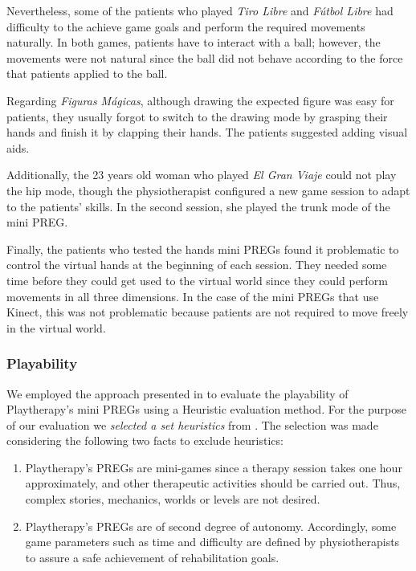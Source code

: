 Nevertheless, some of the patients who played \textit{Tiro Libre} and \textit{F\'utbol Libre} had difficulty to the achieve game goals and perform the required movements naturally. In both games, patients have to interact with a ball; however, the movements were not natural since the ball did not behave according to the force that patients applied to the ball.

Regarding \textit{Figuras M\'agicas}, although drawing the expected figure was easy for patients, they usually forgot to switch to the drawing mode by grasping their hands and finish it by clapping their hands. The patients suggested adding visual aids. 

Additionally, the 23 years old woman who played \textit{El Gran Viaje} could not play the hip mode, though the physiotherapist configured a new game session to adapt to the patients' skills. In the second session, she played the trunk mode of the mini \ac{PREG}.

Finally, the patients who tested the hands mini \acp{PREG} found it problematic to control the virtual hands at the beginning of each session. They needed some time before they could get used to the virtual world since they could perform movements in all three dimensions. In the case of the mini \acp{PREG} that use Kinect, this was not problematic because patients are not required to move freely in the virtual world.

\subsubsection*{Playability}

We employed the approach presented in \autocite{Sanchez2012} to evaluate the playability of Playtherapy's mini \acp{PREG} using a Heuristic evaluation method. For the purpose of our evaluation we \textit{selected a set heuristics} from \autocite{Desurvire2009,Federoff2002}. The selection was made considering the following two facts to exclude heuristics:

\begin{enumerate}
    \item Playtherapy's \acp{PREG} are mini-games since a therapy session takes one hour approximately, and other therapeutic activities should be carried out. Thus, complex stories, mechanics, worlds or levels are not desired.
    \item Playtherapy's \acp{PREG} are of second degree of autonomy. Accordingly, some game parameters such as time and difficulty are defined by physiotherapists to assure a safe achievement of rehabilitation goals.
\end{enumerate}

